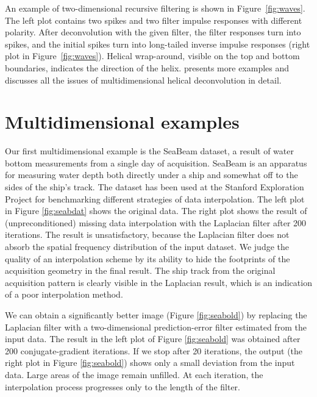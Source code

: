 

An example of two-dimensional recursive filtering is shown in
Figure~\ref{fig:waves}. The left plot contains two spikes and two
filter impulse responses with different polarity. After deconvolution
with the given filter, the filter responses turn into spikes, and the
initial spikes turn into long-tailed inverse impulse responses (right
plot in Figure~\ref{fig:waves}). Helical wrap-around, visible on the
top and bottom boundaries, indicates the direction of the helix.
\cite{gee} presents more examples and discusses all the issues of
multidimensional helical deconvolution in detail.


\section{Multidimensional examples}


Our first multidimensional example is the SeaBeam dataset, a result of
water bottom measurements from a single day of acquisition. SeaBeam is
an apparatus for measuring water depth both directly under a ship and
somewhat off to the sides of the ship's track.  The dataset has been
used at the Stanford Exploration Project for benchmarking different
strategies of data interpolation.  The left plot in Figure
\ref{fig:seabdat} shows the original data. The right plot shows the
result of (unpreconditioned) missing data interpolation with the
Laplacian filter after 200 iterations.  The result is unsatisfactory,
because the Laplacian filter does not absorb the spatial frequency
distribution of the input dataset. We judge the quality of an
interpolation scheme by its ability to hide the footprints of the
acquisition geometry in the final result. The ship track from the
original acquisition pattern is clearly visible in the Laplacian
result, which is an indication of a poor interpolation
method.

\par
We can obtain a significantly better image (Figure \ref{fig:seabold})
by replacing the Laplacian filter with a two-dimensional
prediction-error filter estimated from the input data.  The
result in the left plot of Figure \ref{fig:seabold} was obtained after
200 conjugate-gradient iterations. If we stop after 20 iterations, the
output (the right plot in Figure \ref{fig:seabold}) shows only a small
deviation from the input data. Large areas of the image remain
unfilled. At each iteration, the interpolation process progresses only
to the length of the filter.

